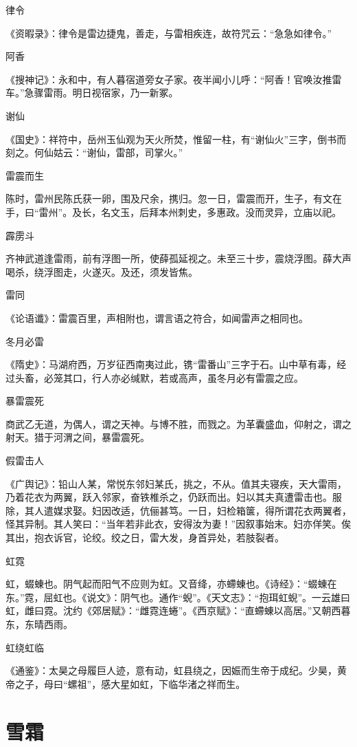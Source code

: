 \documentclass[a4paper,12pt,UTF8,twoside]{ctexbook}
\begin{document}
	律令
	
	《资暇录》：律令是雷边捷鬼，善走，与雷相疾连，故符咒云：“急急如律令。”
	
	阿香
	
	《搜神记》：永和中，有人暮宿道旁女子家。夜半闻小儿呼：“阿香！官唤汝推雷车。”急骤雷雨。明日视宿家，乃一新冢。
	
	谢仙
	
	《国史》：祥符中，岳州玉仙观为天火所焚，惟留一柱，有“谢仙火”三字，倒书而刻之。何仙姑云：“谢仙，雷部，司掌火。”
	
	雷震而生
	
	陈时，雷州民陈氏获一卵，围及尺余，携归。忽一日，雷震而开，生子，有文在手，曰“雷州”。及长，名文玉，后拜本州刺史，多惠政。没而灵异，立庙以祀。
	
	霹雳斗
	
	齐神武道逢雷雨，前有浮图一所，使薛孤延视之。未至三十步，震烧浮图。薛大声喝杀，绕浮图走，火遂灭。及还，须发皆焦。
	
	雷同
	
	《论语谶》：雷震百里，声相附也，谓言语之符合，如闻雷声之相同也。
	
	冬月必雷
	
	《隋史》：马湖府西，万岁征西南夷过此，镌“雷番山”三字于石。山中草有毒，经过头畜，必笼其口，行人亦必缄默，若或高声，虽冬月必有雷震之应。
	
	暴雷震死
	
	商武乙无道，为偶人，谓之天神。与博不胜，而戮之。为革囊盛血，仰射之，谓之射天。猎于河渭之间，暴雷震死。
	
	假雷击人
	
	《广舆记》：铅山人某，常悦东邻妇某氏，挑之，不从。值其夫寝疾，天大雷雨，乃着花衣为两翼，跃入邻家，奋铁椎杀之，仍跃而出。妇以其夫真遭雷击也。服除，其人遣媒求娶。妇因改适，伉俪甚笃。一日，妇检箱箧，得所谓花衣两翼者，怪其异制。其人笑曰：“当年若非此衣，安得汝为妻！”因叙事始末。妇亦佯笑。俟其出，抱衣诉官，论绞。绞之日，雷大发，身首异处，若肢裂者。
	
	虹霓
	
	虹，蝃蝀也。阴气起而阳气不应则为虹。又音绛，亦螮蝀也。《诗经》：“蝃蝀在东。”霓，屈虹也。《说文》：阴气也。通作“蜺”。《天文志》：“抱珥虹蜺”。一云雄曰虹，雌曰霓。沈约《郊居赋》：“雌霓连蜷”。《西京赋》：“直螮蝀以高居。”又朝西暮东，东晴西雨。
	
	虹绕虹临
	
	《通鉴》：太昊之母履巨人迹，意有动，虹县绕之，因娠而生帝于成纪。少昊，黄帝之子，母曰“螺祖”，感大星如虹，下临华渚之祥而生。
	
	\chapter{雪霜}
	
\end{document}
